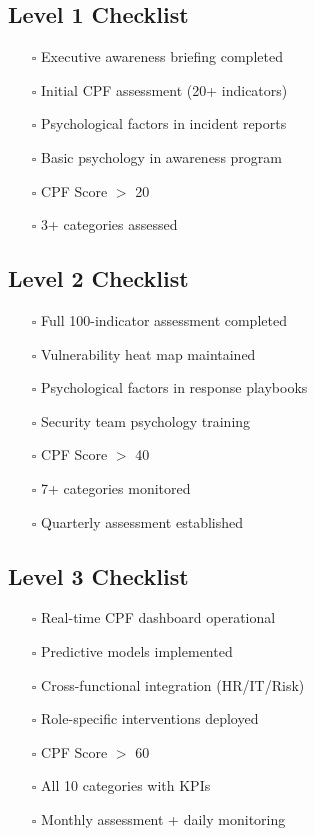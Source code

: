 \documentclass[11pt,a4paper]{article}
\begin{document}
\subsection{Level 1 Checklist}

\begin{itemize}
\item[$\square$] Executive awareness briefing completed
\item[$\square$] Initial CPF assessment (20+ indicators)
\item[$\square$] Psychological factors in incident reports
\item[$\square$] Basic psychology in awareness program
\item[$\square$] CPF Score $>$ 20
\item[$\square$] 3+ categories assessed
\end{itemize}

\subsection{Level 2 Checklist}

\begin{itemize}
\item[$\square$] Full 100-indicator assessment completed
\item[$\square$] Vulnerability heat map maintained
\item[$\square$] Psychological factors in response playbooks
\item[$\square$] Security team psychology training
\item[$\square$] CPF Score $>$ 40
\item[$\square$] 7+ categories monitored
\item[$\square$] Quarterly assessment established
\end{itemize}

\subsection{Level 3 Checklist}

\begin{itemize}
\item[$\square$] Real-time CPF dashboard operational
\item[$\square$] Predictive models implemented
\item[$\square$] Cross-functional integration (HR/IT/Risk)
\item[$\square$] Role-specific interventions deployed
\item[$\square$] CPF Score $>$ 60
\item[$\square$] All 10 categories with KPIs
\item[$\square$] Monthly assessment + daily monitoring
\end{itemize}
\end{document}
